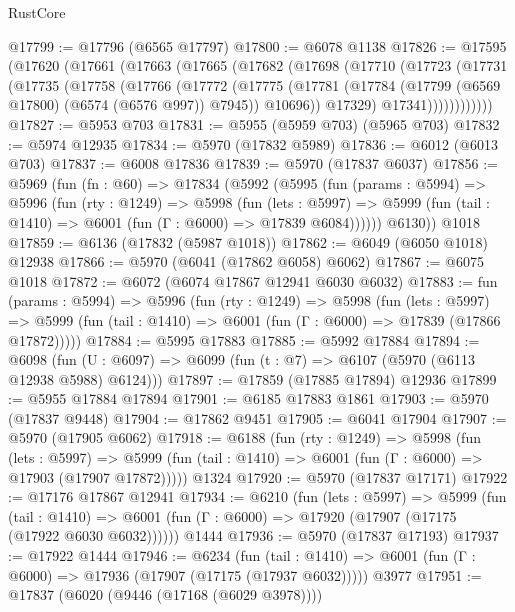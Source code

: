 \begin{lexlean}{RustCore}
\begin{coremodule}
@17799 := @17796 (@6565 @17797)
@17800 := @6078 @1138
@17826 := @17595
    (@17620
      (@17661
        (@17663
          (@17665
            (@17682
              (@17698
                (@17710
                  (@17723
                    (@17731
                      (@17735
                        (@17758
                          (@17766
                            (@17772
                              (@17775
                                (@17781
                                  (@17784 (@17799 (@6569 @17800) (@6574 (@6576 @997)) @7945))
                                  @10696))
                              @17329)
                            @17341))))))))))))
@17827 := @5953 @703
@17831 := @5955 (@5959 @703) (@5965 @703)
@17832 := @5974 @12935
@17834 := @5970 (@17832 @5989)
@17836 := @6012 (@6013 @703)
@17837 := @6008 @17836
@17839 := @5970 (@17837 @6037)
@17856 := @5969
    (fun (fn : @60) =>
    @17834
      (@5992
        (@5995
          (fun (params : @5994) =>
          @5996
            (fun (rty : @1249) =>
            @5998
              (fun (lets : @5997) =>
              @5999 (fun (tail : @1410) => @6001 (fun (Γ : @6000) => @17839 @6084))))))
        @6130))
    @1018
@17859 := @6136 (@17832 (@5987 @1018))
@17862 := @6049 (@6050 @1018) @12938
@17866 := @5970 (@6041 (@17862 @6058) @6062)
@17867 := @6075 @1018
@17872 := @6072 (@6074 @17867 @12941 @6030 @6032)
@17883 := fun (params : @5994) =>
  @5996
    (fun (rty : @1249) =>
    @5998
      (fun (lets : @5997) =>
      @5999 (fun (tail : @1410) => @6001 (fun (Γ : @6000) => @17839 (@17866 @17872)))))
@17884 := @5995 @17883
@17885 := @5992 @17884
@17894 := @6098
    (fun (U : @6097) => @6099 (fun (t : @7) => @6107 (@5970 (@6113 @12938 @5988) @6124)))
@17897 := @17859 (@17885 @17894) @12936
@17899 := @5955 @17884 @17894
@17901 := @6185 @17883 @1861
@17903 := @5970 (@17837 @9448)
@17904 := @17862 @9451
@17905 := @6041 @17904
@17907 := @5970 (@17905 @6062)
@17918 := @6188
    (fun (rty : @1249) =>
    @5998
      (fun (lets : @5997) =>
      @5999 (fun (tail : @1410) => @6001 (fun (Γ : @6000) => @17903 (@17907 @17872)))))
    @1324
@17920 := @5970 (@17837 @17171)
@17922 := @17176 @17867 @12941
@17934 := @6210
    (fun (lets : @5997) =>
    @5999
      (fun (tail : @1410) =>
      @6001 (fun (Γ : @6000) => @17920 (@17907 (@17175 (@17922 @6030 @6032))))))
    @1444
@17936 := @5970 (@17837 @17193)
@17937 := @17922 @1444
@17946 := @6234
    (fun (tail : @1410) => @6001 (fun (Γ : @6000) => @17936 (@17907 (@17175 (@17937 @6032)))))
    @3977
@17951 := @17837 (@6020 (@9446 (@17168 (@6029 @3978))))

\end{coremodule}
\end{lexlean}
